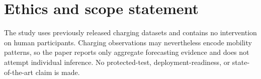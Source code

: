 \documentclass[11pt]{article}
\begin{document}
\section*{Ethics and scope statement}
The study uses previously released charging datasets and contains no intervention on human participants.  Charging observations may nevertheless encode mobility patterns, so the paper reports only aggregate forecasting evidence and does not attempt individual inference.  No protected-test, deployment-readiness, or state-of-the-art claim is made.



\end{document}
